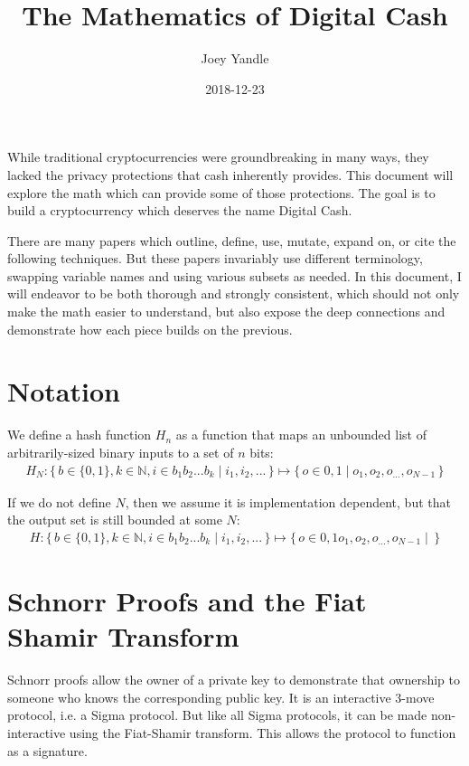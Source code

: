 \documentclass{article}
\title{The Mathematics of Digital Cash}
\date{2018-12-23}
\author{Joey Yandle}
\newcommand\Set[2]{\{\,#1\mid#2\,\}}
\begin{document}
\maketitle

While traditional cryptocurrencies were groundbreaking in many ways, they lacked the privacy protections that cash inherently provides.  This document will explore the math which can provide some of those protections.  The goal is to build a cryptocurrency which deserves the name Digital Cash.

There are many papers which outline, define, use, mutate, expand on, or cite the following techniques.  But these papers invariably use different terminology, swapping variable names and using various subsets as needed.  In this document, I will endeavor to be both thorough and strongly consistent, which should not only make the math easier to understand, but also expose the deep connections and demonstrate how each piece builds on the previous.
\newpage


\section{
  Notation
}

We define a hash function $H_n$ as a function that maps an unbounded list of arbitrarily-sized binary inputs to a set of $n$ bits:
\begin{align}
  H_N: \Set{b \in \{0,1\}, k \in \mathbb{N}, i \in {b_1b_2...b_k}}{i_1, i_2, ...} \mapsto \Set{o \in {0, 1}}{o_1, o_2, o_{...}, o_{N-1}}
\end{align}

If we do not define $N$, then we assume it is implementation dependent, but that the output set is still bounded at some $N$:
\begin{align}
  H: \Set{b \in \{0,1\}, k \in \mathbb{N}, i \in {b_1b_2...b_k}}{i_1, i_2, ...} \mapsto \Set{o \in {0, 1} o_1, o_2, o_{...}, o_{N-1}}{}  
\end{align}


\section{
  Schnorr Proofs and the Fiat Shamir Transform
}

Schnorr proofs allow the owner of a private key to demonstrate that ownership to someone who knows the corresponding public key.  It is an interactive 3-move protocol, i.e. a Sigma protocol.  But like all Sigma protocols, it can be made non-interactive using the Fiat-Shamir transform.  This allows the protocol to function as a signature.
\end{document}
